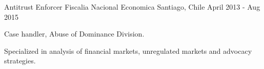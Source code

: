 \begin{cventries}
  \cventry
    {Antitrust Enforcer} %
    {Fiscalia Nacional Economica} %
    {Santiago, Chile} %
    {April 2013 - Aug 2015} %
    {
      \begin{cvitems} %
        \item {Case handler, Abuse of Dominance Division.}
        \item {Specialized in analysis of financial markets, unregulated markets and advocacy strategies.}
      \end{cvitems}
    }

\end{cventries}
